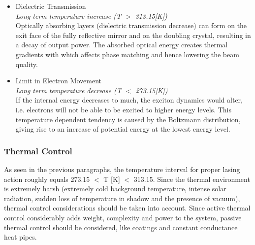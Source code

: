 \begin{itemize}
\item Dielectric Transmission\\
\textit{Long term temperature increase (T $>$ 313.15[K])}\\
Optically absorbing layers (dielectric transmission decrease) can form on the exit face of the fully reflective mirror and on the doubling crystal, resulting in a decay of output power. The absorbed optical energy creates thermal gradients with which affects phase matching and hence lowering the beam quality. 

\item Limit in Electron Movement\\
\textit{Long term temperature decrease (T $<$ 273.15[K])}\\
If the internal energy decreases to much, the exciton dynamics would alter, i.e. electrons will not be able to be excited to higher energy levels. This temperature dependent tendency is caused by the Boltzmann distribution, giving rise to an increase of potential energy at the lowest energy level. 
\end{itemize}	


\subsubsection{Thermal Control}
	\label{mtLSRthermalcontrol}
As seen in the previous paragraphs, the temperature interval for proper lasing action roughly equals 273.15 $<$ T [K] $<$ 313.15. Since the thermal environment is extremely harsh (extremely cold background temperature, intense solar radiation, sudden loss of temperature in shadow and the presence of vacuum), thermal control considerations should be taken into account. Since active thermal control considerably adds weight, complexity and power to the system, passive thermal control should be considered, like coatings and constant conductance heat pipes.

